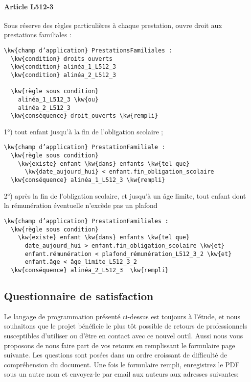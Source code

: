 \documentclass[12pt, french]{article}
\newcommand{\kw}[1]{\textbf{\textcolor{OliveGreen}{#1}}}
\begin{document}
\paragraph{Article L512-3} Sous réserve des règles particulières à chaque prestation, ouvre droit aux prestations familiales :

\begin{Verbatim}[commandchars=\\\{\}]
\kw{champ d’application} PrestationsFamiliales :
  \kw{condition} droits_ouverts
  \kw{condition} alinéa_1_L512_3
  \kw{condition} alinéa_2_L512_3

  \kw{règle sous condition}
    alinéa_1_L512_3 \kw{ou}
    alinéa_2_L512_3
  \kw{conséquence} droit_ouverts \kw{rempli}
\end{Verbatim}

1°) tout enfant jusqu’à la fin de l’obligation scolaire ;

\begin{Verbatim}[commandchars=\\\{\}]
\kw{champ d’application} PrestationFamiliale :
  \kw{règle sous condition}
    \kw{existe} enfant \kw{dans} enfants \kw{tel que}
      \kw{date_aujourd_hui} < enfant.fin_obligation_scolaire
  \kw{conséquence} alinéa_1_L512_3 \kw{rempli}
\end{Verbatim}

2°) après la fin de l’obligation scolaire, et jusqu’à un âge limite, tout enfant dont la rémunération éventuelle n’excède pas un plafond

\begin{Verbatim}[commandchars=\\\{\}]
\kw{champ d’application} PrestationFamiliales :
  \kw{règle sous condition}
    \kw{existe} enfant \kw{dans} enfants \kw{tel que}
      date_aujourd_hui > enfant.fin_obligation_scolaire \kw{et}
      enfant.rémunération < plafond_rémunération_L512_3_2 \kw{et}
      enfant.âge < âge_limite_L512_3_2
  \kw{conséquence} alinéa_2_L512_3  \kw{rempli}
\end{Verbatim}

\subsection{Questionnaire de satisfaction}

Le langage de programmation présenté ci-dessus est toujours à l'étude, et nous souhaitons que le projet bénéficie le plus tôt possible de retours de professionnels susceptibles d'utiliser ou d'être en contact avec ce nouvel outil. Aussi nous vous proposons de nous faire part de vos retours en remplissant le formulaire page suivante. Les questions sont posées dans un ordre croissant de difficulté de compréhension du document. Une fois le formulaire rempli, enregistrez le PDF sous un autre nom et envoyez-le par email aux auteurs aux adresses suivantes:
\end{document}
